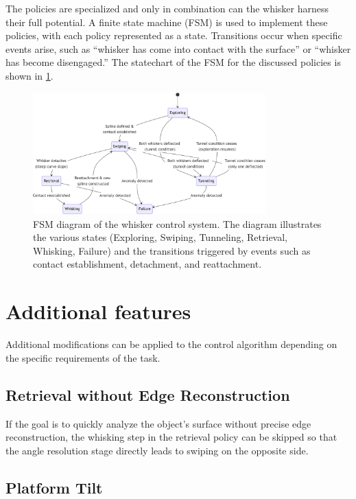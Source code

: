 The policies are specialized and only in combination can the whisker harness their full potential.
A finite state machine (FSM) is used to implement these policies, with each policy represented as a state.
Transitions occur when specific events arise, such as ``whisker has come into contact with the surface'' or ``whisker has become disengaged.''
The statechart of the FSM for the discussed policies is shown in \cref{fig:fsm}.

\begin{figure}[htb]
    \centering
    \includegraphics[width=0.8\textwidth]{figures/fsm}
    \caption{FSM diagram of the whisker control system. The diagram illustrates the various states (Exploring, Swiping, Tunneling, Retrieval, Whisking, Failure) and the transitions triggered by events such as contact establishment, detachment, and reattachment.}
    \label{fig:fsm}
\end{figure}


\section{Additional features}

Additional modifications can be applied to the control algorithm depending on the specific requirements of the task.

\subsection{Retrieval without Edge Reconstruction}

If the goal is to quickly analyze the object's surface without precise edge reconstruction, the whisking step in the retrieval policy can be skipped so that the angle resolution stage directly leads to swiping on the opposite side.

\subsection{Platform Tilt}

